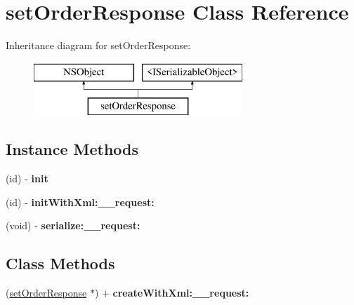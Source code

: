 \hypertarget{interfaceset_order_response}{}\section{set\+Order\+Response Class Reference}
\label{interfaceset_order_response}
Inheritance diagram for set\+Order\+Response\+:\begin{figure}[H]
\begin{center}
\leavevmode
\includegraphics[height=2.000000cm]{interfaceset_order_response}
\end{center}
\end{figure}
\subsection*{Instance Methods}
\begin{DoxyCompactItemize}
\item 
\hypertarget{interfaceset_order_response_af9288759cb6f883b70bf3e3e8fe06d25}{}(id) -\/ {\bfseries init}\label{interfaceset_order_response_af9288759cb6f883b70bf3e3e8fe06d25}

\item 
\hypertarget{interfaceset_order_response_a46b09329f21664e0750a55e5a3fdee34}{}(id) -\/ {\bfseries init\+With\+Xml\+:\+\_\+\+\_\+request\+:}\label{interfaceset_order_response_a46b09329f21664e0750a55e5a3fdee34}

\item 
\hypertarget{interfaceset_order_response_a54e83ac3ecdc46c55d05faee574bf49a}{}(void) -\/ {\bfseries serialize\+:\+\_\+\+\_\+request\+:}\label{interfaceset_order_response_a54e83ac3ecdc46c55d05faee574bf49a}

\end{DoxyCompactItemize}
\subsection*{Class Methods}
\begin{DoxyCompactItemize}
\item 
\hypertarget{interfaceset_order_response_a2f6332f0f16eccb088648c96d71dc8d4}{}(\hyperlink{interfaceset_order_response}{set\+Order\+Response} $\ast$) + {\bfseries create\+With\+Xml\+:\+\_\+\+\_\+request\+:}\label{interfaceset_order_response_a2f6332f0f16eccb088648c96d71dc8d4}

\end{DoxyCompactItemize}

